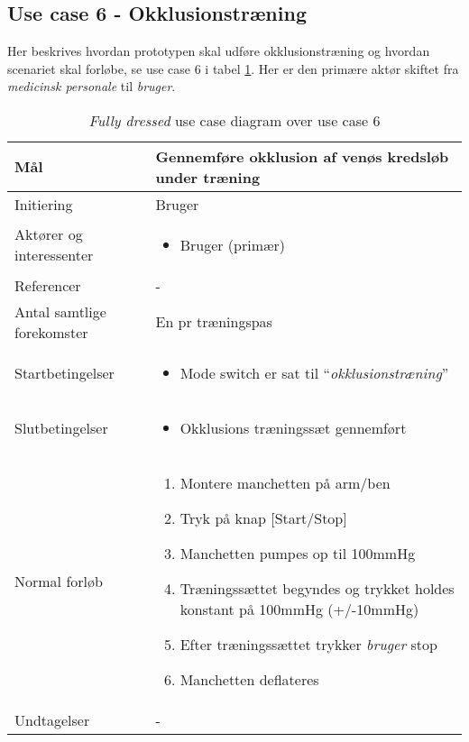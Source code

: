 	\subsection{Use case 6 - Okklusionstræning} \label{title:uc6}
	Her beskrives hvordan prototypen skal udføre okklusionstræning og hvordan scenariet skal forløbe, se use case 6 i tabel \ref{tab:uc6}. Her er den primære aktør skiftet fra \textit{medicinsk personale} til \textit{bruger}.
	\begin{table}[H]
		\begin{center}
			\begin{tabular}{ | p{} | p{}| } 
				\hline
				Mål & Gennemføre okklusion af venøs kredsløb under træning  \\ 
				\hline
				Initiering &  Bruger\\
				\hline
				Aktører og interessenter & 
				\begin{itemize}
					\item Bruger (primær)
				\end{itemize} \\ 
				\hline
				Referencer & - \\ 
				\hline
				Antal samtlige forekomster & En pr træningspas \\ 
				\hline	
				Startbetingelser & 
				\begin{itemize}
					\item Mode switch er sat til  “\textit{okklusionstræning}”
 				\end{itemize} \\ 
				\hline
				Slutbetingelser & 
				\begin{itemize}
					\item Okklusions træningssæt gennemført
				\end{itemize} \\ 
				\hline
				Normal forløb & \begin{enumerate}
					\setlength\itemsep{0cm} %
					\item Montere manchetten på arm/ben
					\item Tryk på knap [Start/Stop]
					\item Manchetten pumpes op til 100mmHg
					\item Træningssættet begyndes og trykket holdes konstant på 100mmHg (+/-10mmHg)
					\item Efter træningssættet trykker \textit{bruger} stop
					\item Manchetten deflateres
				\end{enumerate} \\ 
				\hline
				Undtagelser & - \\ 
				\hline
			\end{tabular}
		\end{center}
		
			\caption{\textit{Fully dressed} use case diagram over use case 6} \label{tab:uc6}
		\end{table}
	\newpage
		